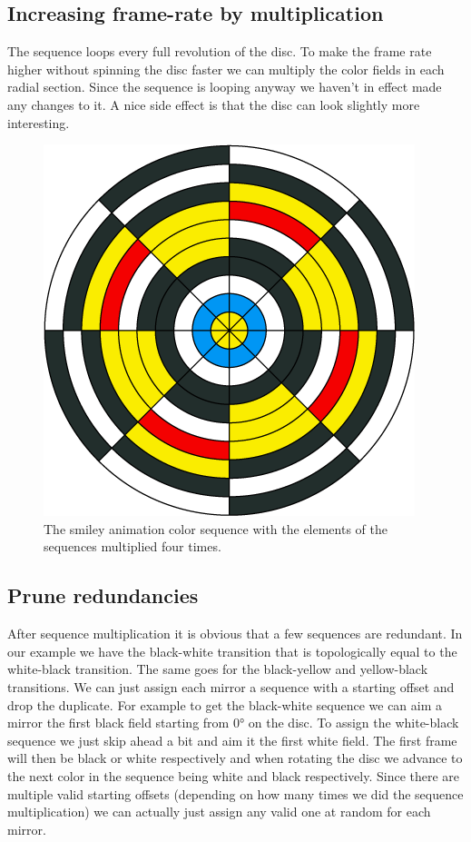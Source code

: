 \documentclass{article}
\begin{document}
\subsection{Increasing frame-rate by multiplication}

The sequence loops every full revolution of the disc. To make the frame
rate higher without spinning the disc faster we can multiply the color
fields in each radial section. Since the sequence is looping anyway we
haven't in effect made any changes to it. A nice side effect is that the
disc can look slightly more interesting.

\begin{figure}[ht!]
\centering
\includegraphics{images/sequence-wheel-frame-duplicate.png}
\caption{The smiley animation color sequence with the elements of the sequences multiplied four times.}
\end{figure}



\subsection{Prune redundancies}

After sequence multiplication it is obvious that a few sequences are
redundant. In our example we have the black-white transition that is
topologically equal to the white-black transition. The same goes for the
black-yellow and yellow-black transitions. We can just assign each
mirror a sequence with a starting offset and drop the duplicate. For
example to get the black-white sequence we can aim a mirror the first
black field starting from 0° on the disc. To assign the white-black
sequence we just skip ahead a bit and aim it the first white field. The
first frame will then be black or white respectively and when rotating
the disc we advance to the next color in the sequence being white and
black respectively. Since there are multiple valid starting offsets
(depending on how many times we did the sequence multiplication) we can
actually just assign any valid one at random for each mirror.
\end{document}
